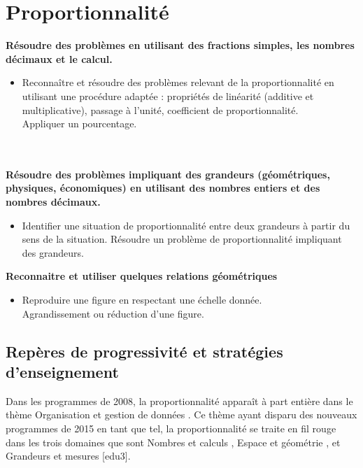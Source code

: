 \chapter{Proportionnalité} \label{Tra8}

\begin{prerequis}
   {\bf Résoudre des problèmes en utilisant des fractions simples, les nombres décimaux et le calcul.}
   \begin{itemize}
      \item Reconnaître et résoudre des problèmes relevant de la proportionnalité en utilisant une procédure adaptée : propriétés de linéarité (additive et multiplicative), passage à l’unité, coefficient de proportionnalité. \\
      Appliquer un pourcentage. \\
      \ \\
      \ \\
   \end{itemize}
   {\bf Résoudre des problèmes impliquant des grandeurs (géométriques, physiques, économiques) en utilisant des nombres entiers et des nombres décimaux.}
   \begin{itemize}
      \item Identifier une situation de proportionnalité entre deux grandeurs à partir du sens de la situation. Résoudre un problème de proportionnalité impliquant des grandeurs.
   \end{itemize}
   {\bf Reconnaitre et utiliser quelques relations géométriques}
   \begin{itemize}
      \item Reproduire une figure en respectant une échelle donnée. \\
      Agrandissement ou réduction d’une figure.
   \end{itemize}
\end{prerequis}


\reperes %

\section{Repères de progressivité et stratégies d'enseignement}

Dans les programmes de 2008, la proportionnalité apparaît à part entière dans le thème \og Organisation et gestion de données \fg{}. Ce thème ayant disparu des nouveaux programmes de 2015 en tant que tel, la proportionnalité se traite en fil rouge dans les trois domaines que sont \og Nombres et calculs \fg, \og Espace et géométrie \fg, et \og Grandeurs et mesures \fg{} [edu3]. \medskip


